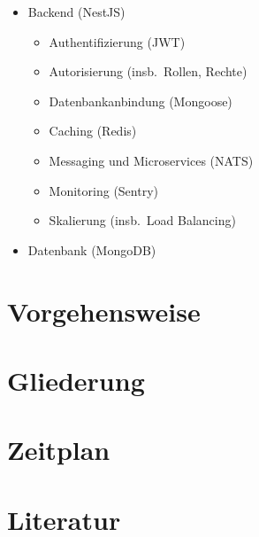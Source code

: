 \begin{itemize}
\begin{itemize}
    \end{itemize}
    \item Backend (NestJS)
    \begin{itemize}
        \item Authentifizierung (JWT)
        \item Autorisierung (insb.\ Rollen, Rechte)
        \item Datenbankanbindung (Mongoose)
        \item Caching (Redis)
        \item Messaging und Microservices (NATS)
        \item Monitoring (Sentry)
        \item Skalierung (insb.\ Load Balancing)
    \end{itemize}
    \item Datenbank (MongoDB)
\end{itemize}

\section{Vorgehensweise}\label{sec:vorgehensweise}

\section{Gliederung}\label{sec:gliederung}

\section{Zeitplan}\label{sec:zeitplan}

\section{Literatur}\label{sec:literatur}

\cite{dragon-book}
